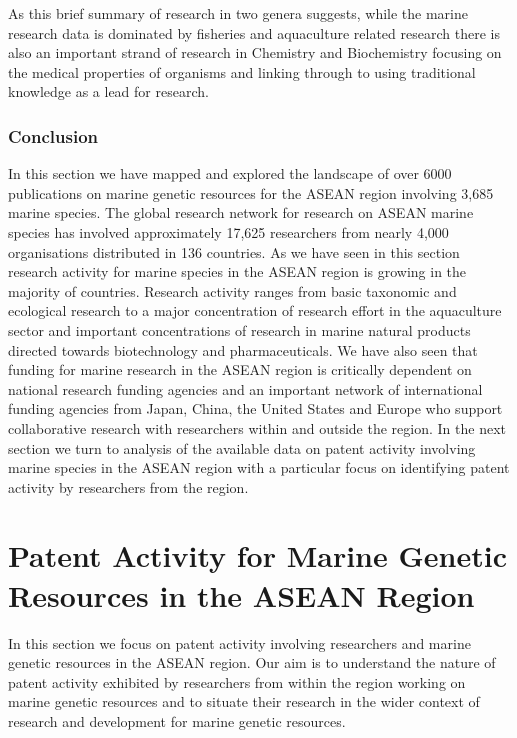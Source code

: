\documentclass[]{book}
\theoremstyle{definition}
\theoremstyle{definition}
\theoremstyle{definition}
\theoremstyle{remark}
\begin{document}
As this brief summary of research in two genera suggests, while the
marine research data is dominated by fisheries and aquaculture related
research there is also an important strand of research in Chemistry and
Biochemistry focusing on the medical properties of organisms and linking
through to using traditional knowledge as a lead for research.

\hypertarget{conclusion-1}{%
\subsection{Conclusion}\label{conclusion-1}}

In this section we have mapped and explored the landscape of over 6000
publications on marine genetic resources for the ASEAN region involving
3,685 marine species. The global research network for research on ASEAN
marine species has involved approximately 17,625 researchers from nearly
4,000 organisations distributed in 136 countries. As we have seen in
this section research activity for marine species in the ASEAN region is
growing in the majority of countries. Research activity ranges from
basic taxonomic and ecological research to a major concentration of
research effort in the aquaculture sector and important concentrations
of research in marine natural products directed towards biotechnology
and pharmaceuticals. We have also seen that funding for marine research
in the ASEAN region is critically dependent on national research funding
agencies and an important network of international funding agencies from
Japan, China, the United States and Europe who support collaborative
research with researchers within and outside the region. In the next
section we turn to analysis of the available data on patent activity
involving marine species in the ASEAN region with a particular focus on
identifying patent activity by researchers from the region.

\hypertarget{patent}{%
\chapter{Patent Activity for Marine Genetic Resources in the ASEAN
Region}\label{patent}}

In this section we focus on patent activity involving researchers and
marine genetic resources in the ASEAN region. Our aim is to understand
the nature of patent activity exhibited by researchers from within the
region working on marine genetic resources and to situate their research
in the wider context of research and development for marine genetic
resources.
\end{document}
